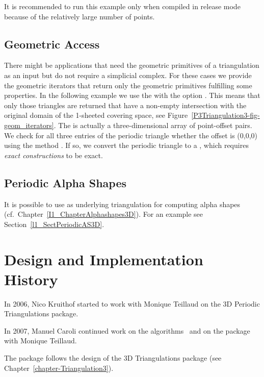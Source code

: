 It is recommended to run this example only when compiled in release
mode because of the relatively large number of points. 


\subsection{Geometric Access}

There might be applications that need the geometric primitives of a
triangulation as an input but do not require a simplicial complex. For
these cases we provide the geometric iterators that return only the
geometric primitives fulfilling some properties. In the following
example we use the  with the option
. This means that only those triangles are
returned that have a non-empty intersection with the original domain
of the 1-sheeted covering space, see
Figure~\ref{P3Triangulation3-fig-geom_iterators}.
The  is actually a three-dimensional array of
point-offset pairs. We check for all three entries of the periodic
triangle whether the offset  is (0,0,0) using the
method . If so, we convert the periodic triangle to a
, which requires \emph{exact constructions} to be
exact.  


\subsection{Periodic Alpha Shapes}

It is possible to use 
as underlying triangulation for computing alpha shapes (cf.\
Chapter~\ref{I1_ChapterAlphashapes3D}). For an example see
Section~\ref{l1_SectPeriodicAS3D}.

\section{Design and Implementation History}

In 2006, Nico Kruithof started to work with Monique Teillaud on the 3D
Periodic Triangulations package.

In 2007, Manuel Caroli continued work on the
algorithms~\cite{cgal:ct-c3pt-09} and on the package with Monique
Teillaud.

The package follows the design of the 3D Triangulations package
(see Chapter~\ref{chapter-Triangulation3}).
